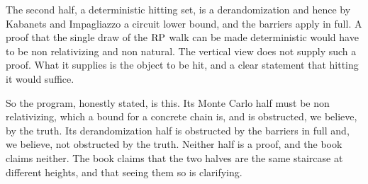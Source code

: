 The second half, a deterministic hitting set, is a derandomization and hence by Kabanets and Impagliazzo a circuit lower bound, and the barriers apply in full. A proof that the single draw of the $\mathrm{RP}$ walk can be made deterministic would have to be non relativizing and non natural. The vertical view does not supply such a proof. What it supplies is the object to be hit, and a clear statement that hitting it would suffice.

So the program, honestly stated, is this. Its Monte Carlo half must be non relativizing, which a bound for a concrete chain is, and is obstructed, we believe, by the truth. Its derandomization half is obstructed by the barriers in full and, we believe, not obstructed by the truth. Neither half is a proof, and the book claims neither. The book claims that the two halves are the same staircase at different heights, and that seeing them so is clarifying.
